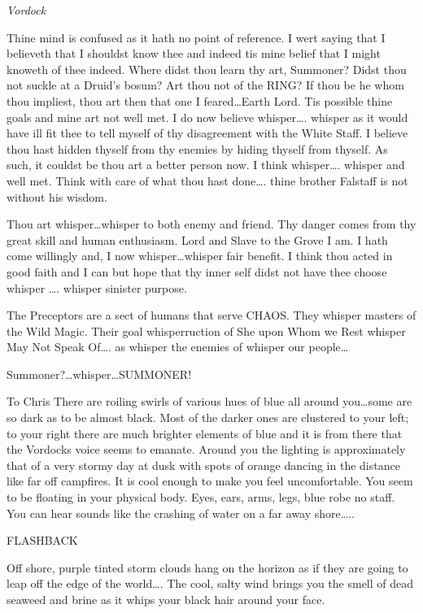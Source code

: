 {{\em Vordock}

Thine mind is confused as it hath no point of reference. I 
wert saying that I believeth that I shouldst know thee and indeed tis 
mine belief that I might knoweth of thee indeed. Where didst thou learn 
thy art, Summoner? Didst thou not suckle at a Druid's bosum? Art thou 
not of the RING? If thou be he whom thou impliest, thou art then that 
one I feared\dots Earth Lord. Tis possible thine goals and mine art not 
well met. I do now believe {whisper\dots. whisper} as it would have ill 
fit thee to tell myself of thy disagreement with the White Staff. I 
believe thou hast hidden thyself from thy enemies by hiding thyself from 
thyself. As such, it couldst be thou art a better person now. I think { 
whisper\dots. whisper} and well met. Think with care of what thou hast 
done\dots. thine brother Falstaff is not without his wisdom.

Thou art{ whisper\dots whisper} to both enemy and friend. Thy danger 
comes from thy great skill and human enthusiasm. Lord and Slave to the 
Grove I am. I hath come willingly and, I now { whisper\dots whisper} 
fair benefit. I think thou acted in good faith and I can but hope that 
thy inner self didst not have thee choose {whisper \dots. whisper} 
sinister purpose.  

The Preceptors are a sect of humans that serve CHAOS. They {whisper} 
masters of the Wild Magic. Their goal {whisper}ruction of She upon Whom 
we Rest {whisper} May Not Speak Of\dots. as {whisper} the enemies of {
whisper} our people\dots

Summoner?\dots {whisper}\dots SUMMONER!

{To Chris There are roiling swirls of various hues of blue all around 
you\dots some are so dark as to be almost black. Most of the darker ones 
are clustered to your left; to your right there are much brighter 
elements of blue and it is from there that the Vordocks voice seems to 
emanate. Around you the lighting is approximately that of a very stormy 
day at dusk with spots of orange dancing in the distance like far off 
campfires. It is cool enough to make you feel uncomfortable. You seem to 
be floating in your physical body. Eyes, ears, arms, legs, blue robe\- 
no staff. You can hear sounds like the crashing of water on a far away 
shore\dots..

FLASHBACK

Off shore, purple tinted storm clouds hang on the horizon as if they are 
going to leap off the edge of the world\dots. The cool, salty wind 
brings you the smell of dead seaweed and brine as it whips your black 
hair around your face.

}}
